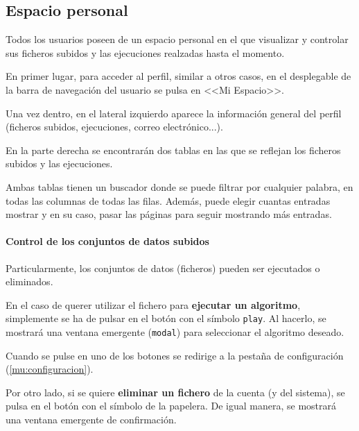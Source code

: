 \label{mu:perfil}

\subsection{Espacio personal}

Todos los usuarios poseen de un espacio personal en el que visualizar y
controlar sus ficheros subidos y las ejecuciones realzadas hasta el momento.

En primer lugar, para acceder al perfil, similar a otros casos, en el
desplegable de la barra de navegación del usuario se pulsa en <<Mi Espacio>>.


Una vez dentro, en el lateral izquierdo aparece la información general del
perfil (ficheros subidos, ejecuciones, correo electrónico...).

En la parte derecha se encontrarán dos tablas en las que se reflejan los
ficheros subidos y las ejecuciones.


Ambas tablas tienen un buscador donde se puede filtrar por cualquier palabra, en
todas las columnas de todas las filas. Además, puede elegir cuantas entradas
mostrar y en su caso, pasar las páginas para seguir mostrando más entradas.

\paragraph{Control de los conjuntos de datos subidos} Particularmente, los
conjuntos de datos (ficheros) pueden ser ejecutados o eliminados.

En el caso de querer utilizar el fichero para \textbf{ejecutar un algoritmo},
simplemente se ha de pulsar en el botón con el símbolo \texttt{play}. Al
hacerlo, se mostrará una ventana emergente (\texttt{modal}) para seleccionar el
algoritmo deseado.


Cuando se pulse en uno de los botones se redirige a la pestaña de configuración
(\ref{mu:configuracion}).

\label{mu:eliminardataset}
Por otro lado, si se quiere \textbf{eliminar un fichero} de la cuenta (y del
sistema), se pulsa en el botón con el símbolo de la papelera. De igual manera,
se mostrará una ventana emergente de confirmación.

